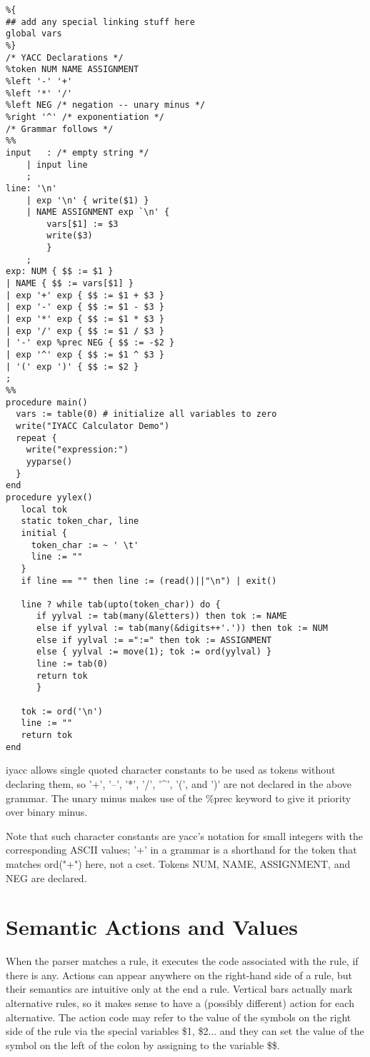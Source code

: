 \documentclass[letterpaper,12pt]{article}
\begin{document}
\begin{verbatim}
%{
## add any special linking stuff here
global vars
%}
/* YACC Declarations */
%token NUM NAME ASSIGNMENT
%left '-' '+'
%left '*' '/'
%left NEG /* negation -- unary minus */
%right '^' /* exponentiation */
/* Grammar follows */
%%
input   : /* empty string */
	| input line
	;
line: '\n'
	| exp '\n' { write($1) }
	| NAME ASSIGNMENT exp `\n' {
	    vars[$1] := $3
	    write($3)
	    }
	;
exp: NUM { $$ := $1 }
| NAME { $$ := vars[$1] }
| exp '+' exp { $$ := $1 + $3 }
| exp '-' exp { $$ := $1 - $3 }
| exp '*' exp { $$ := $1 * $3 }
| exp '/' exp { $$ := $1 / $3 }
| '-' exp %prec NEG { $$ := -$2 }
| exp '^' exp { $$ := $1 ^ $3 }
| '(' exp ')' { $$ := $2 }
;
%%
procedure main()
  vars := table(0) # initialize all variables to zero
  write("IYACC Calculator Demo")
  repeat {
    write("expression:")
    yyparse()
  }
end
procedure yylex()
   local tok
   static token_char, line
   initial { 
     token_char := ~ ' \t'
     line := ""
   }
   if line == "" then line := (read()||"\n") | exit()

   line ? while tab(upto(token_char)) do {
      if yylval := tab(many(&letters)) then tok := NAME
      else if yylval := tab(many(&digits++'.')) then tok := NUM
      else if yylval := =":=" then tok := ASSIGNMENT
      else { yylval := move(1); tok := ord(yylval) }
      line := tab(0)
      return tok
      }   

   tok := ord('\n')
   line := ""
   return tok
end
\end{verbatim}

iyacc allows single quoted character constants to be used as
tokens without declaring them, so 
'+', '–', '*', '/', '\string^', '(', and ')' are not declared in the above
grammar. The unary minus makes use of the \%prec keyword to give it
priority over binary minus. 

Note that such character constants are yacc's notation for small
integers with the corresponding ASCII values; '+' in a grammar is a
shorthand for the token that matches ord("+") here, not a cset.
Tokens NUM, NAME, ASSIGNMENT, and NEG are declared.

\section{Semantic Actions and Values}

When the parser matches a rule, it executes the code associated with
the rule, if there is any. Actions can appear anywhere on the
right-hand side of a rule, but their semantics are intuitive only at
the end a rule. Vertical bars actually mark alternative rules, so it
makes sense to have a (possibly different) action for each
alternative. The action code may refer to the value of the symbols on
the right side of the rule via the special variables \$1, \$2... and
they can set the value of the symbol on the left of the colon by
assigning to the variable \$\$.
\end{document}
